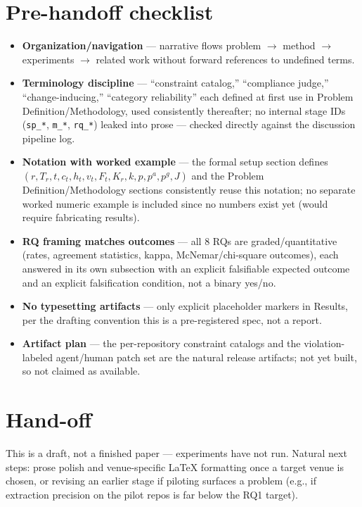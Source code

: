 \documentclass[11pt]{article}
\begin{document}
\section*{Pre-handoff checklist}
\begin{itemize}[leftmargin=1.4em]
\item \textbf{Organization/navigation} --- narrative flows problem $\to$ method $\to$ experiments $\to$ related work without forward references to undefined terms.
\item \textbf{Terminology discipline} --- ``constraint catalog,'' ``compliance judge,'' ``change-inducing,'' ``category reliability'' each defined at first use in Problem Definition/Methodology, used consistently thereafter; no internal stage IDs (\texttt{sp\_*}, \texttt{m\_*}, \texttt{rq\_*}) leaked into prose --- checked directly against the discussion pipeline log.
\item \textbf{Notation with worked example} --- the formal setup section defines $(r, T_r, t, c_t, h_t, v_t, F_t, K_r, k, p, p^a, p^g, J)$ and the Problem Definition/Methodology sections consistently reuse this notation; no separate worked numeric example is included since no numbers exist yet (would require fabricating results).
\item \textbf{RQ framing matches outcomes} --- all 8 RQs are graded/quantitative (rates, agreement statistics, kappa, McNemar/chi-square outcomes), each answered in its own subsection with an explicit falsifiable expected outcome and an explicit falsification condition, not a binary yes/no.
\item \textbf{No typesetting artifacts} --- only explicit placeholder markers in Results, per the drafting convention this is a pre-registered spec, not a report.
\item \textbf{Artifact plan} --- the per-repository constraint catalogs and the violation-labeled agent/human patch set are the natural release artifacts; not yet built, so not claimed as available.
\end{itemize}

\section*{Hand-off}
This is a draft, not a finished paper --- experiments have not run. Natural next steps: prose polish and venue-specific LaTeX formatting once a target venue is chosen, or revising an earlier stage if piloting surfaces a problem (e.g., if extraction precision on the pilot repos is far below the RQ1 target).
\end{document}
